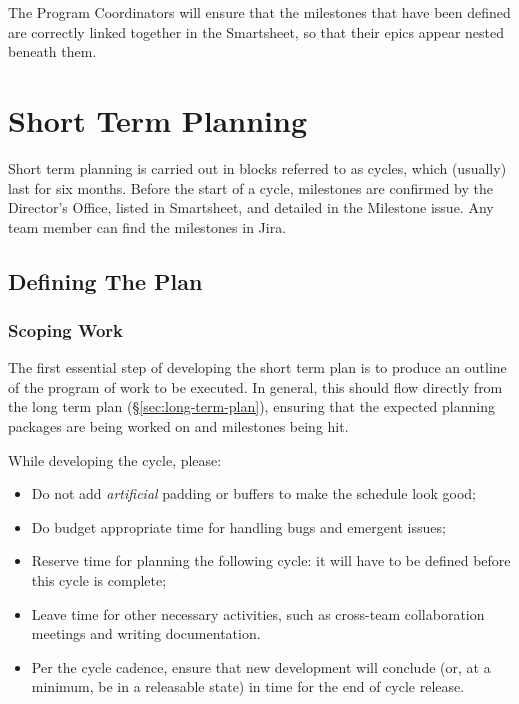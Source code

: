 The Program Coordinators will ensure that the milestones that have been defined are correctly linked together in the Smartsheet, so that their epics appear nested beneath them.


\section{Short Term Planning} \label{sec:cycle-plan}

Short term planning is carried out in blocks referred to as \glspl{cycle}, which (usually) last for six months.
Before the start of a \gls{cycle}, milestones are confirmed by the Director's Office, listed in Smartsheet, and detailed in the Milestone issue. Any team member can find the milestones in Jira.

\subsection{Defining The Plan}

\subsubsection{Scoping Work}

The first essential step of developing the short term plan is to produce an outline of the program of work to be executed.
In general, this should flow directly from the long term plan (\S\ref{sec:long-term-plan}), ensuring that the expected planning packages are being worked on and milestones being hit.

While developing the \gls{cycle}, please:

\begin{itemize}
\item Do not add \emph{artificial} padding or buffers to make the schedule look good;
\item Do budget appropriate time for handling bugs and emergent issues;
\item Reserve time for planning the following \gls{cycle}: it will have to be defined before this \gls{cycle} is complete;
\item Leave time for other necessary activities, such as cross-team collaboration meetings and writing documentation.
\item Per the \gls{cycle} cadence, ensure that new development will conclude (or, at a minimum, be in a releasable state) in time for the end of \gls{cycle} release.
\end{itemize}

